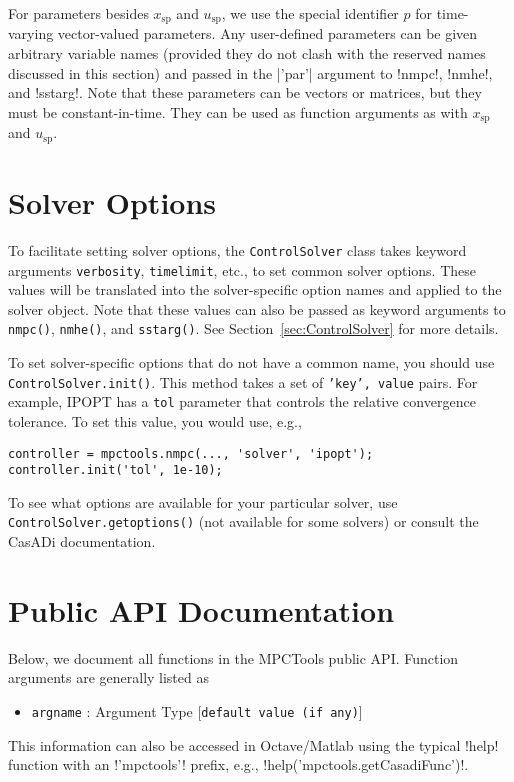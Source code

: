 \documentclass{article}
\newcommand{\casadi}{CasADi}
\newcommand{\mpctools}{MPCTools}
\newcommand{\octave}{Octave/Matlab}
\providecommand{\lstinline}{}
\begin{document}
For parameters besides $x_\text{sp}$ and $u_\text{sp}$, we use the special identifier $p$ for time-varying vector-valued parameters.
Any user-defined parameters can be given arbitrary variable names (provided they do not clash with the reserved names discussed in this section) and passed in the \lstinline|'par'| argument to \lstinline!nmpc!, \lstinline!nmhe!, and \lstinline!sstarg!.
Note that these parameters can be vectors or matrices, but they must be constant-in-time.
They can be used as function arguments as with $x_\text{sp}$ and $u_\text{sp}$.

\section{Solver Options}

To facilitate setting solver options, the \texttt{ControlSolver} class takes keyword arguments \texttt{verbosity}, \texttt{timelimit}, etc., to set common solver options.
These values will be translated into the solver-specific option names and applied to the solver object.
Note that these values can also be passed as keyword arguments to \texttt{nmpc()}, \texttt{nmhe()}, and \texttt{sstarg()}.
See Section~\ref{sec:ControlSolver} for more details.

To set solver-specific options that do not have a common name, you should use \texttt{ControlSolver.init()}.
This method takes a set of \texttt{'key', value} pairs.
For example, IPOPT has a \texttt{tol} parameter that controls the relative convergence tolerance. To set this value, you would use, e.g.,
%
\begin{lstlisting}
controller = mpctools.nmpc(..., 'solver', 'ipopt');
controller.init('tol', 1e-10);
\end{lstlisting}
%
To see what options are available for your particular solver, use \texttt{ControlSolver.getoptions()} (not available for some solvers) or consult the \casadi{} documentation.

\section{Public API Documentation} \label{sec:fulldoc}

Below, we document all functions in the \mpctools{} public API.
Function arguments are generally listed as
%
\begin{itemize}
    \item \texttt{argname} : Argument Type [\texttt{default value (if any)}]
\end{itemize}
%
This information can also be accessed in \octave{} using the typical \lstinline!help! function with an \lstinline!'mpctools'! prefix, e.g., \lstinline!help('mpctools.getCasadiFunc')!.
\end{document}
